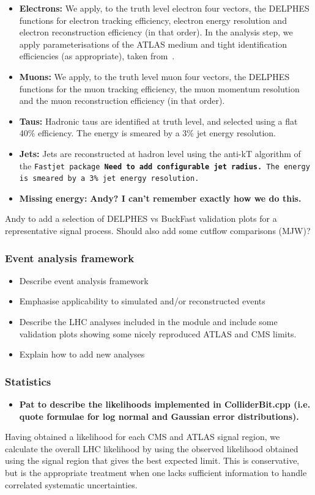 \begin{itemize}
\item \textbf{Electrons: }We apply, to the truth level electron four vectors, the DELPHES functions for electron tracking efficiency, electron energy resolution and electron reconstruction efficiency (in that order). In the analysis step, we apply parameterisations of the ATLAS medium and tight identification efficiencies (as appropriate), taken from~\cite{ATLAS-CONF-2014-032}.
\item \textbf{Muons: }We apply, to the truth level muon four vectors, the DELPHES functions for the muon tracking efficiency, the muon momentum resolution and the muon reconstruction efficiency (in that order). 
\item \textbf{Taus: }Hadronic taus are identified at truth level, and selected using a flat 40\% efficiency. The energy is smeared by a 3\% jet energy resolution.
\item \textbf{Jets: }Jets are reconstructed at hadron level using the anti-kT algorithm of the \tt Fastjet \rm package \textbf{Need to add configurable jet radius.} The energy is smeared by a 3\% jet energy resolution.
\item \textbf{Missing energy: }\textbf{Andy? I can't remember exactly how we do this.}
\end{itemize}

Andy to add a selection of DELPHES vs BuckFast validation plots for a representative signal process. Should also add some cutflow comparisons (MJW)?

\subsubsection{Event analysis framework}

\begin{itemize}
\item Describe event analysis framework
\item Emphasise applicability to simulated and/or reconstructed events
\item Describe the LHC analyses included in the module and include some validation plots showing some nicely reproduced ATLAS and CMS limits.
\item Explain how to add new analyses
\end{itemize}

\subsubsection{Statistics}
\label{sec:stats}
\begin{itemize}
\item \textbf{Pat to describe the likelihoods implemented in ColliderBit.cpp (i.e. quote formulae for log normal and Gaussian error distributions).}
\end{itemize}
Having obtained a likelihood for each CMS and ATLAS signal region, we calculate the overall LHC likelihood by using the observed likelihood obtained using the signal region that gives the best expected limit. This is conservative, but is the appropriate treatment when one lacks sufficient information to handle correlated systematic uncertainties.


